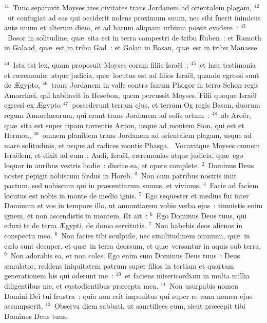 ${}^{41}$~Tunc separavit Moyses tres civitates trans Jordanem ad orientalem plagam,
${}^{42}$~ut confugiat ad eas qui occiderit nolens proximum suum, nec sibi fuerit inimicus ante unum et alterum diem, et ad harum aliquam urbium possit evadere~:
${}^{43}$~Bosor in solitudine, qu\ae\ sita est in terra campestri de tribu Ruben~: et Ramoth in Galaad, qu\ae\ est in tribu Gad~: et Golan in Basan, qu\ae\ est in tribu Manasse.


${}^{44}$~Ista est lex, quam proposuit Moyses coram filiis Isra\"el~:
${}^{45}$~et h\ae c testimonia et c\ae remoni\ae\ atque judicia, qu\ae\ locutus est ad filios Isra\"el, quando egressi sunt de \AE gypto,
${}^{46}$~trans Jordanem in valle contra fanum Phogor in terra Sehon regis Amorrh\ae i, qui habitavit in Hesebon, quem percussit Moyses. Filii quoque Isra\"el egressi ex \AE gypto
${}^{47}$~possederunt terram ejus, et terram Og regis Basan, duorum regum Amorrh\ae orum, qui erant trans Jordanem ad solis ortum~:
${}^{48}$~ab Aro\"er, qu\ae\ sita est super ripam torrentis Arnon, usque ad montem Sion, qui est et Hermon,
${}^{49}$~omnem planitiem trans Jordanem ad orientalem plagam, usque ad mare solitudinis, et usque ad radices montis Phasga.
~Vocavitque Moyses omnem Isra\"elem, et dixit ad eum~: Audi, Isra\"el, c\ae remonias atque judicia, qu\ae\ ego loquor in auribus vestris hodie~: discite ea, et opere complete.
${}^{2}$~Dominus Deus noster pepigit nobiscum fœdus in Horeb.
${}^{3}$~Non cum patribus nostris iniit pactum, sed nobiscum qui in pr\ae sentiarum sumus, et vivimus.
${}^{4}$~Facie ad faciem locutus est nobis in monte de medio ignis.
${}^{5}$~Ego sequester et medius fui inter Dominum et vos in tempore illo, ut annuntiarem vobis verba ejus~: timuistis enim ignem, et non ascendistis in montem. Et ait~:
${}^{6}$~Ego Dominus Deus tuus, qui eduxi te de terra \AE gypti, de domo servitutis.
${}^{7}$~Non habebis deos alienos in conspectu meo.
${}^{8}$~Non facies tibi sculptile, nec similitudinem omnium, qu\ae\ in c\ae lo sunt desuper, et qu\ae\ in terra deorsum, et qu\ae\ versantur in aquis sub terra.
${}^{9}$~Non adorabis ea, et non coles. Ego enim sum Dominus Deus tuus~: Deus \ae mulator, reddens iniquitatem patrum super filios in tertiam et quartam generationem his qui oderunt me~:
${}^{10}$~et faciens misericordiam in multa millia diligentibus me, et custodientibus pr\ae cepta mea.
${}^{11}$~Non usurpabis nomen Domini Dei tui frustra~: quia non erit impunitus qui super re vana nomen ejus assumpserit.
${}^{12}$~Observa diem sabbati, ut sanctifices eum, sicut pr\ae cepit tibi Dominus Deus tuus.
